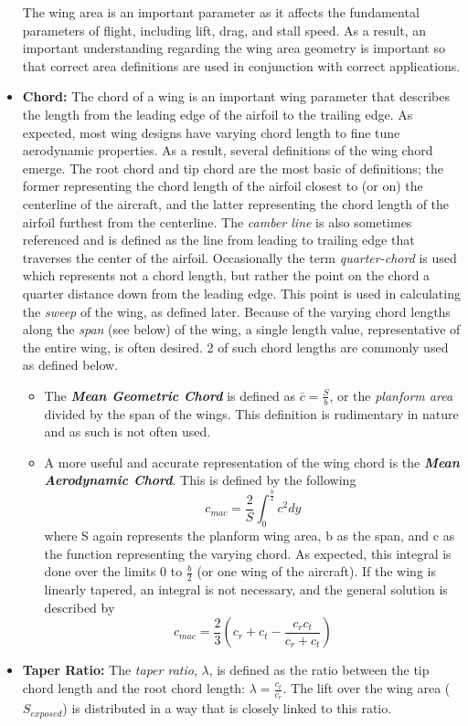 \documentclass{article}
\begin{document}
\begin{itemize}
    The wing area is an important parameter as it affects the fundamental parameters of flight, 
    including lift, drag, and stall speed. As a result, an important understanding regarding the 
    wing area geometry is important so that correct area definitions are used in conjunction with
    correct applications.
    \item[] \textbf{Chord:} The chord of a wing is an important wing parameter that describes the length 
    from the leading edge of the airfoil to the trailing edge. As expected, most wing designs have 
    varying chord length to fine tune aerodynamic properties. As a result, several definitions of the wing
    chord emerge. The root chord and tip chord are the most basic of definitions; the former 
    representing the chord length of the airfoil closest to (or on) the centerline of the aircraft, 
    and the latter representing the chord length of the airfoil furthest from the centerline.
    The \textit{camber line} is also sometimes referenced and is defined as the line from leading to trailing edge that traverses the center of the airfoil. 
    Occasionally the term \textit{quarter-chord} is used which represents not a chord length, but rather the point
    on the chord a quarter distance down from the leading edge. This point is used in calculating the \textit{sweep}
    of the wing, as defined later. Because of the varying chord lengths along the \textit{span} (see below) of the wing,
    a single length value, representative of the entire wing, is often desired. 2 of such chord lengths are commonly
    used as defined below.
    \begin{itemize}
        \item The \textbf{\textit{Mean Geometric Chord}} is defined as $\bar{c} = \frac{S}{b}$, or the \textit{planform area} divided
        by the span of the wings. This definition is rudimentary in nature and as such is not often used.
        \item A more useful and accurate representation of the wing chord is the \textbf{\textit{Mean Aerodynamic Chord}}.
        This is defined by the following
        \begin{equation}
        c_{mac} = \frac{2}{S} \int_{0}^{\frac{b}{2}} c^2 dy
        \end{equation}
        where S again represents the planform wing area, b as the span, and c as the function representing the varying chord.
        As expected, this integral is done over the limits 0 to $\frac{b}{2}$ (or one wing of the aircraft). If the wing is 
        linearly tapered, an integral is not necessary, and the general solution is described by
        \begin{equation}
        c_{mac} = \frac{2}{3}\left(c_r + c_t - \frac{c_r c_t}{c_r + c_t}\right)
        \end{equation}
    \end{itemize}
    \item[] \textbf{Taper Ratio:} The \textit{taper ratio}, $\lambda$, is defined as the ratio between the tip chord
    length and the root chord length: $\lambda = \frac{c_t}{c_r}$. The lift over the wing area ($S_{exposed}$) is distributed in
    a way that is closely linked to this ratio.


\end{itemize}
\end{document}
